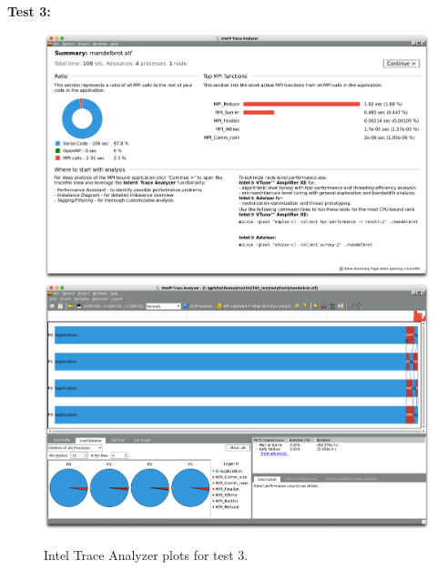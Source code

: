 \documentclass[a4paper,titlepage]{article}
\begin{document}
\noindent
\textbf{Test 3:}  
\begin{figure}[htbp]
\begin{center}
\includegraphics[scale=0.3]{figures/test3_summary}
\includegraphics[scale=0.3]{figures/test3_eventTimeline}
\caption{Intel Trace Analyzer plots for test 3.}
\label{fig:test3_ITAC_summary}
\end{center}
\end{figure}
\end{document}
